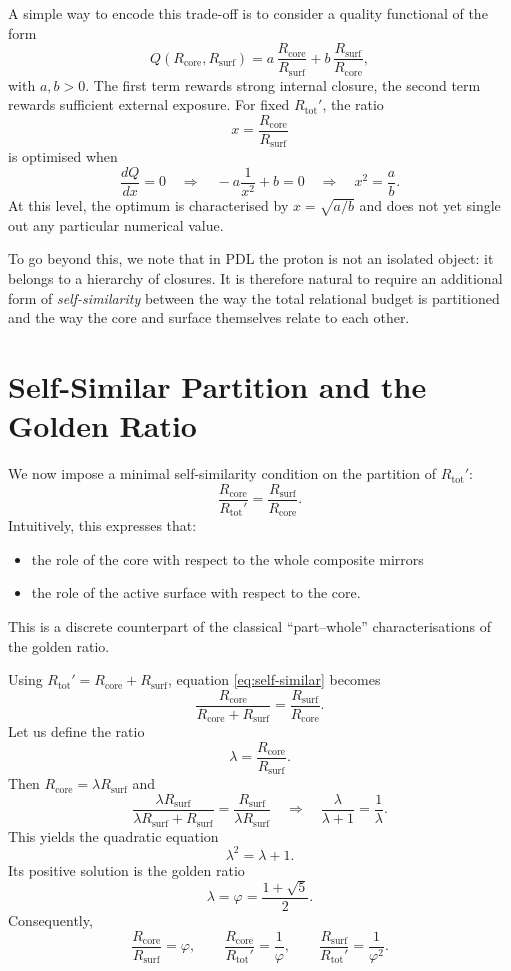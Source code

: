 \documentclass[11pt,a4paper]{article}
\begin{document}
A simple way to encode this trade-off is to consider a quality functional of the form
\[
Q(R_{\text{core}},R_{\text{surf}}) = a \,\frac{R_{\text{core}}}{R_{\text{surf}}} + b \,\frac{R_{\text{surf}}}{R_{\text{core}}},
\]
with $a,b>0$. The first term rewards strong internal closure, the second term rewards sufficient external exposure. For fixed $R_{\text{tot}}'$, the ratio
\[
x = \frac{R_{\text{core}}}{R_{\text{surf}}}
\]
is optimised when
\[
\frac{dQ}{dx} = 0 \quad \Rightarrow \quad -a \frac{1}{x^2} + b = 0 \quad \Rightarrow \quad x^2 = \frac{a}{b}.
\]
At this level, the optimum is characterised by $x = \sqrt{a/b}$ and does not yet single out any particular numerical value.

To go beyond this, we note that in PDL the proton is not an isolated object: it belongs to a hierarchy of closures. It is therefore natural to require an additional form of \emph{self-similarity} between the way the total relational budget is partitioned and the way the core and surface themselves relate to each other.

\section{Self-Similar Partition and the Golden Ratio}

We now impose a minimal self-similarity condition on the partition of $R_{\text{tot}}'$:
\begin{equation}
\frac{R_{\text{core}}}{R_{\text{tot}}'} = \frac{R_{\text{surf}}}{R_{\text{core}}}.
\label{eq:self-similar}
\end{equation}
Intuitively, this expresses that:
\begin{itemize}
  \item the role of the core with respect to the whole composite mirrors
  \item the role of the active surface with respect to the core.
\end{itemize}
This is a discrete counterpart of the classical ``part--whole'' characterisations of the golden ratio.

Using $R_{\text{tot}}' = R_{\text{core}} + R_{\text{surf}}$, equation \eqref{eq:self-similar} becomes
\[
\frac{R_{\text{core}}}{R_{\text{core}} + R_{\text{surf}}} = \frac{R_{\text{surf}}}{R_{\text{core}}}.
\]
Let us define the ratio
\[
\lambda = \frac{R_{\text{core}}}{R_{\text{surf}}}.
\]
Then $R_{\text{core}} = \lambda R_{\text{surf}}$ and
\[
\frac{\lambda R_{\text{surf}}}{\lambda R_{\text{surf}} + R_{\text{surf}}} = \frac{R_{\text{surf}}}{\lambda R_{\text{surf}}}
\quad\Rightarrow\quad
\frac{\lambda}{\lambda + 1} = \frac{1}{\lambda}.
\]
This yields the quadratic equation
\[
\lambda^2 = \lambda + 1.
\]
Its positive solution is the golden ratio
\[
\lambda = \varphi = \frac{1 + \sqrt{5}}{2}.
\]
Consequently,
\[
\frac{R_{\text{core}}}{R_{\text{surf}}} = \varphi,\qquad
\frac{R_{\text{core}}}{R_{\text{tot}}'} = \frac{1}{\varphi},\qquad
\frac{R_{\text{surf}}}{R_{\text{tot}}'} = \frac{1}{\varphi^2}.
\]
\end{document}
